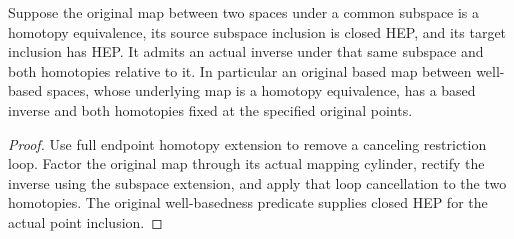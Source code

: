 \begin{proposition}
  \label{prop:actual-relative-homotopy-equivalences}
  \leanok
  Suppose the original map between two spaces under a common subspace is a homotopy equivalence, its source subspace inclusion is closed HEP, and its target inclusion has HEP. It admits an actual inverse under that same subspace and both homotopies relative to it. In particular an original based map between well-based spaces, whose underlying map is a homotopy equivalence, has a based inverse and both homotopies fixed at the specified original points.
\end{proposition}
\begin{proof}
  Use full endpoint homotopy extension to remove a canceling restriction loop. Factor the original map through its actual mapping cylinder, rectify the inverse using the subspace extension, and apply that loop cancellation to the two homotopies. The original well-basedness predicate supplies closed HEP for the actual point inclusion.
  \leanok
\end{proof}

